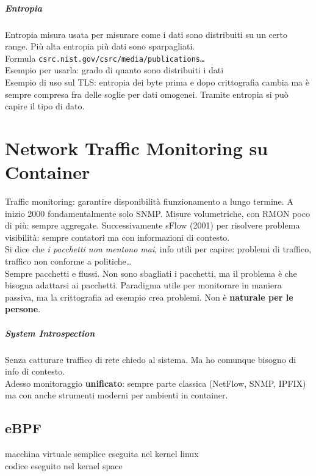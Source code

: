 \documentclass[10pt]{book}
\begin{document}
\paragraph{Entropia} Entropia misura usata per misurare come i dati sono distribuiti su un certo range. Più alta entropia più dati sono sparpagliati.\\
Formula \texttt{csrc.nist.gov/csrc/media/publications\ldots}\\
Esempio per usarla: grado di quanto sono distribuiti i dati\\
Esempio di uso sul TLS: entropia dei byte prima e dopo crittografia cambia ma è sempre compresa fra delle soglie per dati omogenei. Tramite entropia si può capire il tipo di dato.
\chapter{Network Traffic Monitoring su Container}
Traffic monitoring: garantire disponibilità fiunzionamento a lungo termine. A inizio 2000 fondamentalmente solo SNMP. Misure volumetriche, con RMON poco di più: sempre aggregate. Successivamente sFlow (2001) per risolvere problema visibilità: sempre contatori ma con informazioni di contesto.\\
Si dice che \textit{i pacchetti non mentono mai}, info utili per capire: problemi di traffico, traffico non conforme a politiche\ldots\\
Sempre pacchetti e flussi. Non sono sbagliati i pacchetti, ma il problema è che bisogna adattarsi ai pacchetti. Paradigma utile per monitorare in maniera passiva, ma la crittografia ad esempio crea problemi. Non è \textbf{naturale per le persone}.
\paragraph{System Introspection} Senza catturare traffico di rete chiedo al sistema. Ma ho comunque bisogno di info di contesto.\\
Adesso monitoraggio \textbf{unificato}: sempre parte classica (NetFlow, SNMP, IPFIX) ma con anche strumenti moderni per ambienti in container.
\section{eBPF}
macchina virtuale semplice eseguita nel kernel linux\\
codice eseguito nel kernel space
\end{document}
